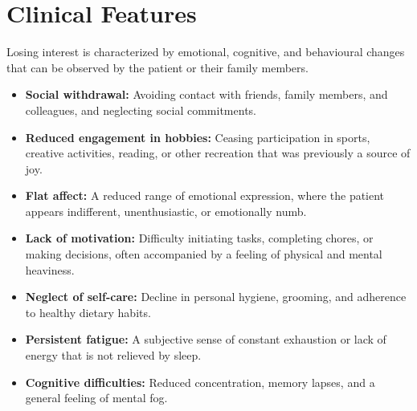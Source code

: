 \section*{Clinical Features}
Losing interest is characterized by emotional, cognitive, and behavioural changes that can be observed by the patient or their family members.
\begin{itemize}
    \item \textbf{Social withdrawal:} Avoiding contact with friends, family members, and colleagues, and neglecting social commitments.
    \item \textbf{Reduced engagement in hobbies:} Ceasing participation in sports, creative activities, reading, or other recreation that was previously a source of joy.
    \item \textbf{Flat affect:} A reduced range of emotional expression, where the patient appears indifferent, unenthusiastic, or emotionally numb.
    \item \textbf{Lack of motivation:} Difficulty initiating tasks, completing chores, or making decisions, often accompanied by a feeling of physical and mental heaviness.
    \item \textbf{Neglect of self-care:} Decline in personal hygiene, grooming, and adherence to healthy dietary habits.
    \item \textbf{Persistent fatigue:} A subjective sense of constant exhaustion or lack of energy that is not relieved by sleep.
    \item \textbf{Cognitive difficulties:} Reduced concentration, memory lapses, and a general feeling of mental fog.
\end{itemize}

